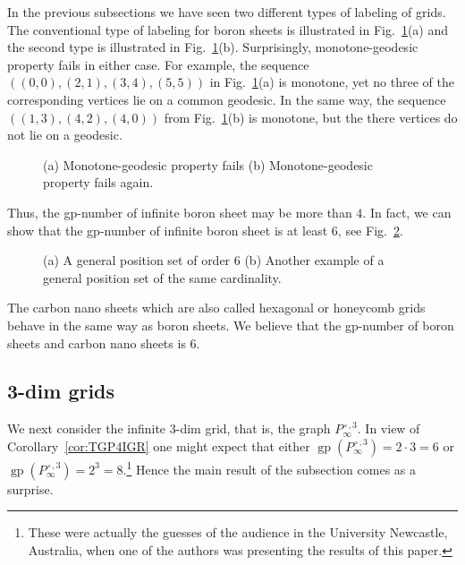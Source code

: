 \documentclass[12pt]{article}
\def\cp{\,\square\,}
\DeclareMathOperator {\gp} {gp}
\begin{document}
In the previous subsections we have seen two different types of labeling of grids. The conventional type of labeling for boron sheets is illustrated in Fig.~\ref{fig:FBORSH}(a) and the second type is illustrated in Fig.~\ref{fig:FBORSH}(b). Surprisingly, monotone-geodesic property fails in either case. For example,  the sequence $((0,0), (2,1), (3,4), (5,5))$ in Fig.~\ref{fig:FBORSH}(a) is monotone, yet no three of the corresponding vertices lie on a common geodesic. In the same way, the sequence $((1,3), (4,2), (4,0))$ from Fig.~\ref{fig:FBORSH}(b) is monotone, but the there vertices do not lie on a geodesic.

\begin{figure}[ht!]
	\begin{center}
	\end{center}
	\caption{(a) Monotone-geodesic property fails  (b) Monotone-geodesic property fails again.}
	\label{fig:FBORSH}
\end{figure}

Thus, the gp-number of infinite boron sheet may be more than $4$. In fact, we can show that the gp-number of infinite boron sheet is at least $6$, see Fig.~\ref{fig:FHexBor6}.

\begin{figure}[ht!]
	\begin{center}
	\end{center}
	\caption{(a) A general position set of order $6$ (b) Another example of a general position set of the same cardinality.}
	\label{fig:FHexBor6}
\end{figure}

The carbon nano sheets which are also called hexagonal or honeycomb grids behave in the same way as boron sheets. We believe that the gp-number of boron sheets and carbon nano sheets is $6$. 

\subsection{3-dim grids}
\label{subsec:3grids}

We next consider the infinite $3$-dim grid, that is, the graph $P_{\infty}^{\cp,3}$. In view of Corollary~\ref{cor:TGP4IGR} one might expect that either $\gp(P_{\infty}^{\cp,3}) = 2\cdot 3 = 6$ or $\gp(P_{\infty}^{\cp,3}) = 2^3 = 8$.\footnote{These were actually the guesses of the audience in the University Newcastle, Australia, when one of the authors was presenting the results of this paper.} Hence the main result of the subsection comes as a surprise. 
\end{document}
